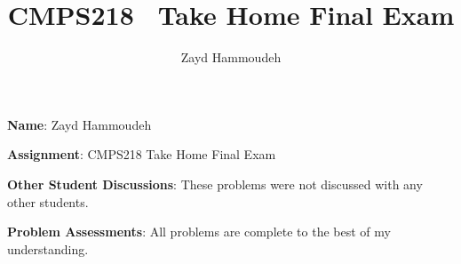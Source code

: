 \documentclass{report}
\title{\textbf{CMPS218 \textendash\ Take Home Final Exam}}
\author{Zayd Hammoudeh}
\begin{document}

  \textbf{Name}: Zayd Hammoudeh

  \textbf{Assignment}:  CMPS218 Take Home Final Exam

  \textbf{Other Student Discussions}: These problems were not discussed with any other students.

  \textbf{Problem Assessments}: All problems are complete to the best of my understanding.

  

  

  

  
\end{document}
